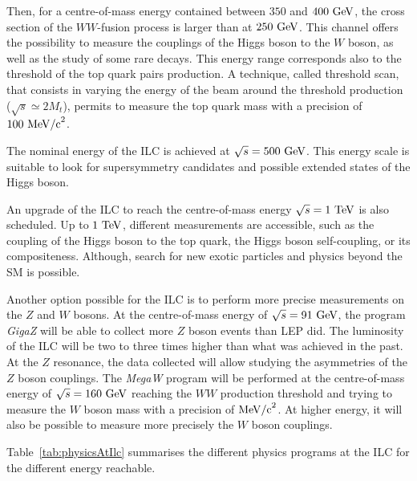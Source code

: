   Then, for a centre-of-mass energy contained between $350$ and $400~\rm{GeV}$, the cross section of the $WW$-fusion process is larger than at $250~\rm{GeV}$.
  This channel offers the possibility to measure the couplings of the Higgs boson to the $W$ boson, as well as the study of some rare decays.
  This energy range corresponds also to the threshold of the top quark pairs production.
  A technique, called threshold scan, that consists in varying the energy of the beam around the threshold production ($\sqrt{s} \simeq 2M_{t}$), permits to measure the top quark mass with a precision of $100~\rm{MeV/c}^2$.

  The nominal energy of the \gls{ILC} is achieved at $\sqrt{s} = 500~\rm{GeV}$.
  This energy scale is suitable to look for supersymmetry candidates and possible extended states of the Higgs boson.

  An upgrade of the \gls{ILC} to reach the centre-of-mass energy $\sqrt{s} = 1~\rm{TeV}$ is also scheduled.
  Up to $1~\rm{TeV}$, different measurements are accessible, such as the coupling of the Higgs boson to the top quark, the Higgs boson self-coupling, or its compositeness.
  Although, search for new exotic particles and physics beyond the \gls{SM} is possible.

  Another option possible for the \gls{ILC} is to perform more precise measurements on the $Z$ and $W$ bosons.
  At the centre-of-mass energy of $\sqrt{s} = 91~\rm{GeV}$, the program \textit{GigaZ} will be able to collect more $Z$ boson events than \gls{LEP} did.
  The luminosity of the \gls{ILC} will be two to three times higher than what was achieved in the past.
  At the $Z$ resonance, the data collected will allow studying the asymmetries of the $Z$ boson couplings.
  The \textit{MegaW} program will be performed at the centre-of-mass energy of $\sqrt{s} = 160~\rm{GeV}$ reaching the $WW$ production threshold and trying to measure the $W$ boson mass with a precision of $\rm{MeV/c}^2$.
  At higher energy, it will also be possible to measure more precisely the $W$ boson couplings.
 
  Table~\ref{tab:physicsAtIlc} summarises the different physics programs at the \gls{ILC} for the different energy reachable.  

